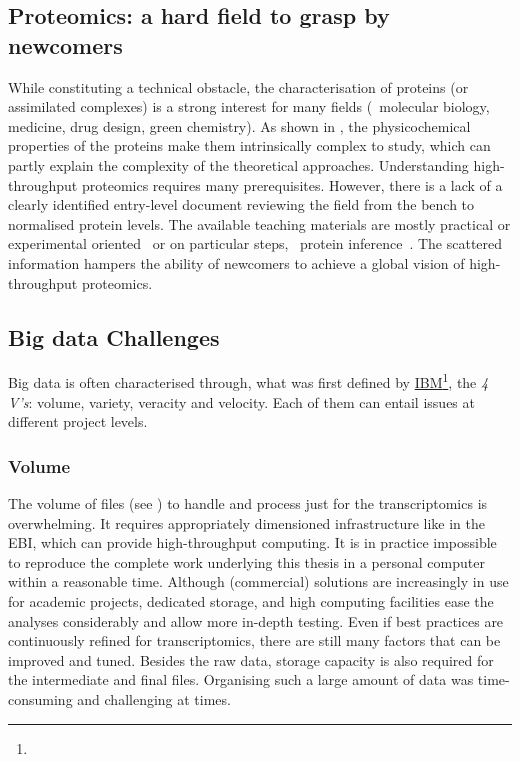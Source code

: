 \subsection*{Proteomics: a hard field to grasp by newcomers}
\vspace{-6mm}
While constituting a technical obstacle,
the characterisation of proteins (or assimilated complexes)
is a strong interest for many fields
(\eg\ molecular biology, medicine, drug design, green chemistry).
As shown in ,
the physicochemical properties of the proteins make them
intrinsically complex to study,
which can partly explain the complexity of the theoretical approaches.
Understanding high-throughput proteomics requires many prerequisites.
However, there is a lack of a clearly identified entry-level document
reviewing the field from the bench to normalised protein levels.
The available teaching materials are mostly
practical or experimental oriented~ or
on particular steps, \eg\ protein inference~.
The scattered information hampers the ability of newcomers
to achieve a global vision of high-throughput proteomics.\mybr\

\subsection*{Big data Challenges}
\vspace{-6mm}
Big data is often characterised through, what was first defined by
\href{https://www.ibmbigdatahub.com/infographic/four-vs-big-data}{IBM}\footnote{%
},
the \emph{4 V's}: volume, variety, veracity and velocity.
Each of them can entail issues at different project levels.\mybr\

\subsubsection*{Volume}
\vspace{-3mm}
The volume of files (see )
to handle and process just for the transcriptomics is overwhelming.
It requires appropriately dimensioned infrastructure
like in the \gls{EBI}, which can provide high-throughput computing.
It is in practice impossible to reproduce the complete work underlying
this thesis in a personal computer within a reasonable time.
Although (commercial) solutions are increasingly in use for academic projects,
dedicated storage, and high computing facilities ease the analyses considerably
and allow more in-depth testing.
Even if best practices are continuously refined for transcriptomics,
there are still many factors that can be improved and tuned.
Besides the raw data,
storage capacity is also required for the intermediate and final files.
Organising such a large amount of data was time-consuming and
challenging at times.\mybr\

